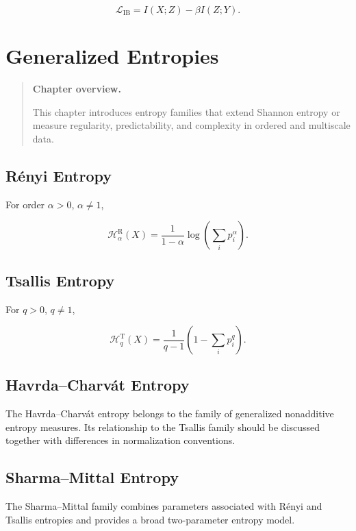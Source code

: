 \documentclass[11pt,oneside]{book}
\theoremstyle{remark}
\newcommand{\Entropy}{\mathcal{H}}
\newenvironment{chapteroverview}
{
	\begin{quote}
		\small
		\textbf{Chapter overview.}
	}
	{
	\end{quote}
}
\begin{document}
	\[
	\mathcal{L}_{\mathrm{IB}}
	=
	I(X;Z)-\beta I(Z;Y).
	\]
	
	
	\chapter{Generalized Entropies}
	\label{chap:generalized-entropies}
	
	\begin{chapteroverview}
		This chapter introduces entropy families that extend Shannon entropy or measure
		regularity, predictability, and complexity in ordered and multiscale data.
	\end{chapteroverview}
	
	\section{Rényi Entropy}
	
	For order \(\alpha>0\), \(\alpha\neq1\),
	
	\[
	\Entropy_{\alpha}^{\mathrm{R}}(X)
	=
	\frac{1}{1-\alpha}
	\log
	\left(
	\sum_i p_i^\alpha
	\right).
	\]
	
	\section{Tsallis Entropy}
	
	For \(q>0\), \(q\neq1\),
	
	\[
	\Entropy_q^{\mathrm{T}}(X)
	=
	\frac{1}{q-1}
	\left(
	1-\sum_i p_i^q
	\right).
	\]
	
	\section{Havrda--Charvát Entropy}
	
	The Havrda--Charvát entropy belongs to the family of generalized
	nonadditive entropy measures. Its relationship to the Tsallis family should
	be discussed together with differences in normalization conventions.
	
	\section{Sharma--Mittal Entropy}
	
	The Sharma--Mittal family combines parameters associated with Rényi and
	Tsallis entropies and provides a broad two-parameter entropy model.
	
\end{document}
